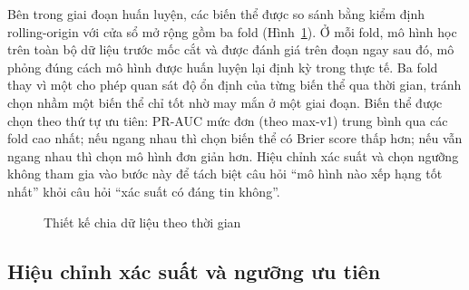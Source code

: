 Bên trong giai đoạn huấn luyện, các biến thể được so sánh bằng kiểm định rolling-origin với cửa sổ mở rộng gồm ba fold (Hình~\ref{fig:temporal-folds}). Ở mỗi fold, mô hình học trên toàn bộ dữ liệu trước mốc cắt và được đánh giá trên đoạn ngay sau đó, mô phỏng đúng cách mô hình được huấn luyện lại định kỳ trong thực tế. Ba fold thay vì một cho phép quan sát độ ổn định của từng biến thể qua thời gian, tránh chọn nhầm một biến thể chỉ tốt nhờ may mắn ở một giai đoạn. Biến thể được chọn theo thứ tự ưu tiên: PR-AUC mức đơn (theo max-v1) trung bình qua các fold cao nhất; nếu ngang nhau thì chọn biến thể có Brier score thấp hơn; nếu vẫn ngang nhau thì chọn mô hình đơn giản hơn. Hiệu chỉnh xác suất và chọn ngưỡng không tham gia vào bước này để tách biệt câu hỏi ``mô hình nào xếp hạng tốt nhất'' khỏi câu hỏi ``xác suất có đáng tin không''.

\begin{figure}[htbp]\centering
{}
\caption{Thiết kế chia dữ liệu theo thời gian}
\label{fig:temporal-folds}
\end{figure}

\subsection{Hiệu chỉnh xác suất và ngưỡng ưu tiên}

